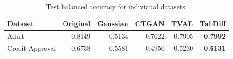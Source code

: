 \begin{table}
\centering
\caption{Test balanced accuracy for individual datasets.}
\begin{tabular}{lrrrrr}
\toprule
Dataset & Original & Gaussian & CTGAN & TVAE & TabDiff \\
\midrule
Adult & 0.8149 & 0.5134 & 0.7622 & 0.7905 & \textbf{0.7992} \\
Credit Approval & 0.6738 & 0.5581 & 0.4950 & 0.5230 & \textbf{0.6131} \\
\bottomrule
\end{tabular}
\end{table}
